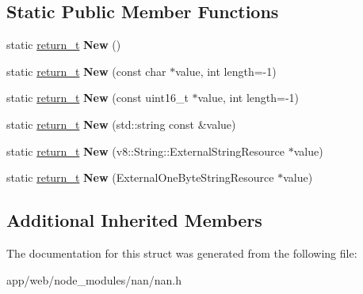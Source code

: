 \subsection*{Static Public Member Functions}
\begin{DoxyCompactItemize}
\item 
\mbox{\label{struct_nan_1_1imp_1_1_factory_3_01v8_1_1_string_01_4_a46a8319e898b33d3b11713c3b828ab80}} 
static \hyperlink{class_maybe_local}{return\+\_\+t} {\bfseries New} ()
\item 
\mbox{\label{struct_nan_1_1imp_1_1_factory_3_01v8_1_1_string_01_4_a6a950af48d30a070c2d7ff34ad025915}} 
static \hyperlink{class_maybe_local}{return\+\_\+t} {\bfseries New} (const char $\ast$value, int length=-\/1)
\item 
\mbox{\label{struct_nan_1_1imp_1_1_factory_3_01v8_1_1_string_01_4_a2c6f64a05af4f264e64e245e611b773d}} 
static \hyperlink{class_maybe_local}{return\+\_\+t} {\bfseries New} (const uint16\+\_\+t $\ast$value, int length=-\/1)
\item 
\mbox{\label{struct_nan_1_1imp_1_1_factory_3_01v8_1_1_string_01_4_a68f3e61d3388c929927b9f33330ac061}} 
static \hyperlink{class_maybe_local}{return\+\_\+t} {\bfseries New} (std\+::string const \&value)
\item 
\mbox{\label{struct_nan_1_1imp_1_1_factory_3_01v8_1_1_string_01_4_a4f9282ba86fc218f6f353776243d32f3}} 
static \hyperlink{class_maybe_local}{return\+\_\+t} {\bfseries New} (v8\+::\+String\+::\+External\+String\+Resource $\ast$value)
\item 
\mbox{\label{struct_nan_1_1imp_1_1_factory_3_01v8_1_1_string_01_4_ad985477d3b8386a2a08c51fab0761280}} 
static \hyperlink{class_maybe_local}{return\+\_\+t} {\bfseries New} (External\+One\+Byte\+String\+Resource $\ast$value)
\end{DoxyCompactItemize}
\subsection*{Additional Inherited Members}


The documentation for this struct was generated from the following file\+:\begin{DoxyCompactItemize}
\item 
app/web/node\+\_\+modules/nan/nan.\+h\end{DoxyCompactItemize}
